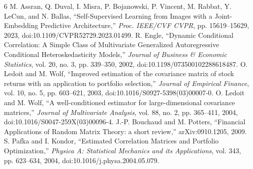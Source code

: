 \documentclass[11pt]{article}
\begin{document}
\begin{thebibliography}{6}
 M. Assran, Q. Duval, I. Misra, P. Bojanowski, P. Vincent, M. Rabbat, Y. LeCun, and N. Ballas, ``Self-Supervised Learning from Images with a Joint-Embedding Predictive Architecture,'' \emph{Proc. IEEE/CVF CVPR}, pp. 15619--15629, 2023, doi:10.1109/CVPR52729.2023.01499.
 R. Engle, ``Dynamic Conditional Correlation: A Simple Class of Multivariate Generalized Autoregressive Conditional Heteroskedasticity Models,'' \emph{Journal of Business \& Economic Statistics}, vol. 20, no. 3, pp. 339--350, 2002, doi:10.1198/073500102288618487.
 O. Ledoit and M. Wolf, ``Improved estimation of the covariance matrix of stock returns with an application to portfolio selection,'' \emph{Journal of Empirical Finance}, vol. 10, no. 5, pp. 603--621, 2003, doi:10.1016/S0927-5398(03)00007-0.
 O. Ledoit and M. Wolf, ``A well-conditioned estimator for large-dimensional covariance matrices,'' \emph{Journal of Multivariate Analysis}, vol. 88, no. 2, pp. 365--411, 2004, doi:10.1016/S0047-259X(03)00096-4.
 J.-P. Bouchaud and M. Potters, ``Financial Applications of Random Matrix Theory: a short review,'' arXiv:0910.1205, 2009.
 S. Pafka and I. Kondor, ``Estimated Correlation Matrices and Portfolio Optimization,'' \emph{Physica A: Statistical Mechanics and its Applications}, vol. 343, pp. 623--634, 2004, doi:10.1016/j.physa.2004.05.079.
\end{thebibliography}
\end{document}
